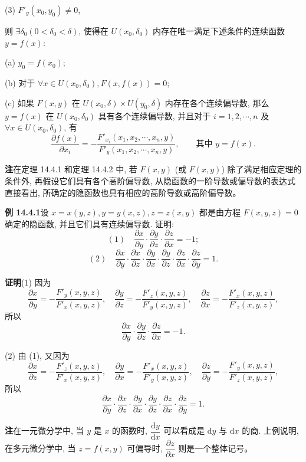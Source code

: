 \documentclass[UTF8, 12pt, fontset=fandol, oneside]{ctexart}
\begin{document}
(3) $F'_y(x_0,y_0)\ne0$,

则 $\exists\delta_0(0<\delta_0<\delta)$, 使得在 $U(x_0,\delta_0)$ 内存在唯一满足下述条件的连续函数 $y=f(x)$:

(a) $y_0=f(x_0)$;

(b) 对于 $\forall x\in U(x_0,\delta_0),F(x,f(x))=0$;

(c) 如果 $F(x,y)$ 在 $U(x_0,\delta)\times U(y_0,\delta)$ 内存在各个连续偏导数, 那么 $y=f(x)$ 在 $U(x_0,\delta_0)$ 具有各个连续偏导数, 并且对于 $i=1,2,\cdots,n$ 及 $\forall x\in U(x_0,\delta_0)$, 有
\[
  \frac{\partial f(x)}{\partial x_i}
  =-\frac{F'_{x_i}(x_1,x_2,\cdots,x_n,y)}
  {F'_y(x_1,x_2,\cdots,x_n,y)},\qquad
  \text{其中 }y=f(x).
\]

\noindent\textbf{注}\quad 在定理 14.4.1 和定理 14.4.2 中, 若 $F(x,y)$ (或 $F(x,y)$) 除了满足相应定理的条件外, 再假设它们具有各个高阶偏导数, 从隐函数的一阶导数或偏导数的表达式直接看出, 所确定的隐函数也具有相应的高阶导数或高阶偏导数。

\noindent\textbf{例 14.4.1}\quad 设 $x=x(y,z),y=y(x,z),z=z(x,y)$ 都是由方程 $F(x,y,z)=0$ 确定的隐函数, 并且它们具有连续偏导数. 证明:
\[
  (1)\quad \frac{\partial x}{\partial y}\cdot
  \frac{\partial y}{\partial z}\cdot
  \frac{\partial z}{\partial x}=-1;
\]
\[
  (2)\quad \frac{\partial x}{\partial y}\cdot
  \frac{\partial x}{\partial z}\cdot
  \frac{\partial y}{\partial x}\cdot
  \frac{\partial y}{\partial z}\cdot
  \frac{\partial z}{\partial x}\cdot
  \frac{\partial z}{\partial y}=1.
\]

\noindent\textbf{证明}\quad (1) 因为
\[
  \frac{\partial x}{\partial y}=-\frac{F'_y(x,y,z)}{F'_x(x,y,z)},\quad
  \frac{\partial y}{\partial z}=-\frac{F'_z(x,y,z)}{F'_y(x,y,z)},\quad
  \frac{\partial z}{\partial x}=-\frac{F'_x(x,y,z)}{F'_z(x,y,z)},
\]
所以
\[
  \frac{\partial x}{\partial y}\cdot
  \frac{\partial y}{\partial z}\cdot
  \frac{\partial z}{\partial x}=-1.
\]

(2) 由 (1), 又因为
\[
  \frac{\partial x}{\partial z}=-\frac{F'_z(x,y,z)}{F'_x(x,y,z)},\quad
  \frac{\partial y}{\partial x}=-\frac{F'_x(x,y,z)}{F'_y(x,y,z)},\quad
  \frac{\partial z}{\partial y}=-\frac{F'_y(x,y,z)}{F'_z(x,y,z)},
\]
所以
\[
  \frac{\partial x}{\partial y}\cdot
  \frac{\partial x}{\partial z}\cdot
  \frac{\partial y}{\partial x}\cdot
  \frac{\partial y}{\partial z}\cdot
  \frac{\partial z}{\partial x}\cdot
  \frac{\partial z}{\partial y}=1.
\]

\noindent\textbf{注}\quad 在一元微分学中, 当 $y$ 是 $x$ 的函数时, $\dfrac{\mathrm dy}{\mathrm dx}$ 可以看成是 $\mathrm dy$ 与 $\mathrm dx$ 的商. 上例说明, 在多元微分学中, 当 $z=f(x,y)$ 可偏导时, $\dfrac{\partial z}{\partial x}$ 则是一个整体记号。
\end{document}
